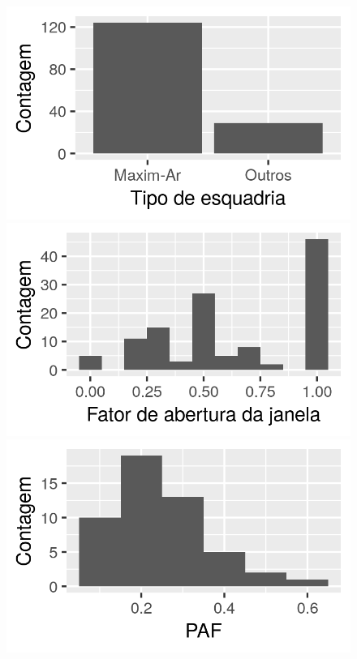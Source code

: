 \documentclass[brazil,hardcopy,openany,a4paper]{ufscthesis}
\begin{document}
\begin{figure}
\begin{minipage}{.5\textwidth}
		\end{minipage}%
		\begin{minipage}{.5\textwidth}
			\centering
			\includegraphics[width=\linewidth]{img/hist_esquadria.png}
		\end{minipage}
		\centering	
		\begin{minipage}{.5\textwidth}
			\centering
			\includegraphics[width=\linewidth]{img/hist_openfac.png}
		\end{minipage}%
		\begin{minipage}{.5\textwidth}
			\centering
			\includegraphics[width=\linewidth]{img/hist_PAF.png}

\end{minipage}
\end{figure}
\end{document}
